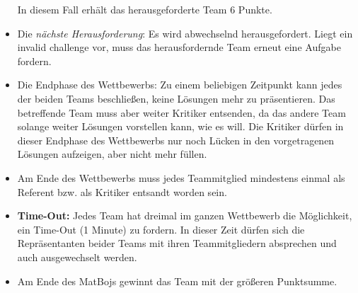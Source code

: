 \begin{itemize}
	In diesem Fall erhält das herausgeforderte Team $6$ Punkte.
	\item Die \textit{nächste Herausforderung}: Es wird abwechselnd herausgefordert. Liegt ein invalid challenge vor, muss das herausfordernde Team erneut eine Aufgabe fordern.
	\item Die Endphase des Wettbewerbs: Zu einem beliebigen Zeitpunkt kann jedes der beiden Teams beschließen, keine Lösungen mehr zu präsentieren. Das betreffende Team muss aber weiter Kritiker entsenden, da das andere Team solange weiter Lösungen vorstellen kann, wie es will. Die Kritiker dürfen in dieser Endphase des Wettbewerbs nur noch Lücken in den vorgetragenen Lösungen aufzeigen, aber nicht mehr füllen.
	\item Am Ende des Wettbewerbs muss jedes Teammitglied mindestens einmal als Referent bzw. als Kritiker entsandt worden sein.
	\item \textbf{Time-Out:} Jedes Team hat dreimal im ganzen Wettbewerb die Möglichkeit, ein Time-Out (1 Minute) zu fordern. In dieser Zeit dürfen sich die Repräsentanten beider Teams  mit ihren Teammitgliedern absprechen und auch ausgewechselt werden.
	\item Am Ende des MatBojs gewinnt das Team mit der größeren Punktsumme. 
\end{itemize}
%